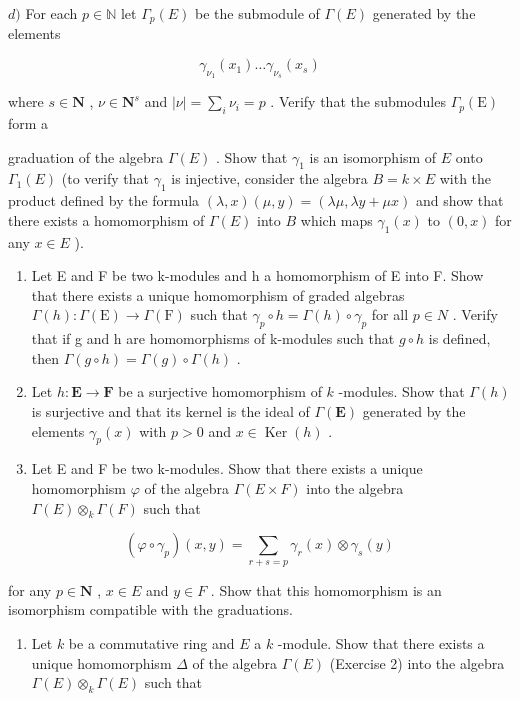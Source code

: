 \(d)\) For each \(p \in \mathbb{N}\) let \(\Gamma_p(E)\) be the submodule of \(\Gamma(E)\) generated by the elements

\[
\gamma_ {\nu_ {1}} (x _ {1}) \dots \gamma_ {\nu_ {s}} (x _ {s})
\]

where \(s \in \mathbf{N}\) , \(\nu \in \mathbf{N}^s\) and \(|\nu| = \sum_{i} \nu_i = p\) . Verify that the submodules \(\Gamma_p(\mathrm{E})\) form a

graduation of the algebra \(\Gamma(E)\) . Show that \(\gamma_{1}\) is an isomorphism of \(E\) onto \(\Gamma_{1}(E)\) (to verify that \(\gamma_{1}\) is injective, consider the algebra \(B = k \times E\) with the product defined by the formula \((\lambda, x)(\mu, y) = (\lambda \mu, \lambda y + \mu x)\) and show that there exists a homomorphism of \(\Gamma(E)\) into \(B\) which maps \(\gamma_{1}(x)\) to \((0, x)\) for any \(x \in E\) ).

\begin{enumerate}
\def\labelenumi{\alph{enumi})}
\setcounter{enumi}{4}
\item
  Let E and F be two k-modules and h a homomorphism of E into F. Show that there exists a unique homomorphism of graded algebras \(\Gamma(h):\Gamma(\mathrm{E})\to\Gamma(\mathrm{F})\) such that \(\gamma_{p}\circ h=\Gamma(h)\circ\gamma_{p}\) for all \(p\in N\) . Verify that if g and h are homomorphisms of k-modules such that \(g\circ h\) is defined, then \(\Gamma(g\circ h)=\Gamma(g)\circ\Gamma(h)\) .
\item
  Let \(h: \mathbf{E} \to \mathbf{F}\) be a surjective homomorphism of \(k\) -modules. Show that \(\Gamma(h)\) is surjective and that its kernel is the ideal of \(\Gamma(\mathbf{E})\) generated by the elements \(\gamma_p(x)\) with \(p > 0\) and \(x \in \operatorname{Ker}(h)\) .
\item
  Let E and F be two k-modules. Show that there exists a unique homomorphism \(\varphi\) of the algebra \(\Gamma(E \times F)\) into the algebra \(\Gamma(E) \otimes_{k} \Gamma(F)\) such that
\end{enumerate}

\[
(\varphi \circ \gamma_ {p}) (x, y) = \sum_ {r + s = p} \gamma_ {r} (x) \otimes \gamma_ {s} (y)
\]

for any \(p \in \mathbf{N}\) , \(x \in E\) and \(y \in F\) . Show that this homomorphism is an isomorphism compatible with the graduations.

\begin{enumerate}
\def\labelenumi{\arabic{enumi})}
\setcounter{enumi}{2}
\tightlist
\item
  Let \(k\) be a commutative ring and \(E\) a \(k\) -module. Show that there exists a unique homomorphism \(\Delta\) of the algebra \(\Gamma(E)\) (Exercise 2) into the algebra \(\Gamma(E) \otimes_k \Gamma(E)\) such that
\end{enumerate}

